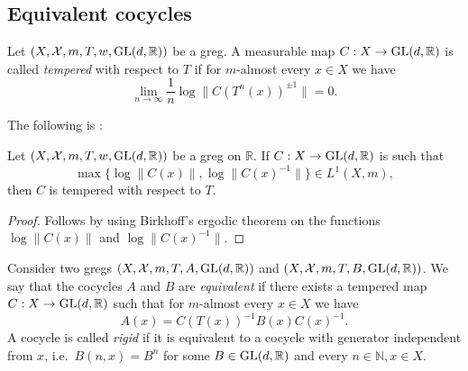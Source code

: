 \documentclass{report}
\begin{document}
    \subsection{Equivalent cocycles}
    \begin{definition}
        Let $(X, \mathcal X, m, T, w, \operatorname{{\mathrm{GL}}}(d,\mathbb R))$ be a greg.
        A measurable map $C: X \to \operatorname{{\mathrm{GL}}}(d, \mathbb R)$ is called \emph{tempered} with respect to $T$ if for $m$-almost every $x \in X$ we have
        \[
        \lim_{ n \to \infty} \frac{1}{n} \log \|C(T^n(x))^{\pm 1}\| = 0.
        \]
    \end{definition}
    The following is \cite[Lemma S.2.4]{katok1995introduction}:
    \begin{lemma}
        Let $(X, \mathcal X, m, T, w, \operatorname{{\mathrm{GL}}}(d,\mathbb R))$ be a greg on $\mathbb R$.
        If $C: X \to \operatorname{{\mathrm{GL}}}(d, \mathbb R)$ is such that
        \[
        \max \{\log \|C(x)\|, \log \|C(x)^{-1}\|\} \in L^1(X, m),
        \]
        then $C$ is tempered with respect to $T$.
    \end{lemma}
    \begin{proof}
        Follows by using Birkhoff's ergodic theorem on the functions $\log \|C(x)\|$ and $\log \|C(x)^{-1}\|$.
    \end{proof}
    \begin{definition}
        Consider two gregs $(X, \mathcal X, m, T, A, \operatorname{{\mathrm{GL}}}(d,\mathbb R))$ and $(X, \mathcal X, m, T, B, \operatorname{{\mathrm{GL}}}(d,\mathbb R))$.
        We say that the cocycles $A$ and $B$ are \emph{equivalent} if there exists a tempered map $C: X \to \operatorname{{\mathrm{GL}}}(d, \mathbb R)$ such that for $m$-almost every $x \in X$ we have
        \[
        A(x) = C(T(x))^{-1} B(x) C(x)^{-1}.
        \]
        A cocycle is called \emph{rigid} if it is equivalent to a cocycle with generator independent from $x$, i.e.\ $B(n,x) = B^n$ for some $B \in \operatorname{{\mathrm{GL}}}(d,\mathbb R)$ and every $n \in \mathbb N, x \in X$.
    \end{definition}
\end{document}
